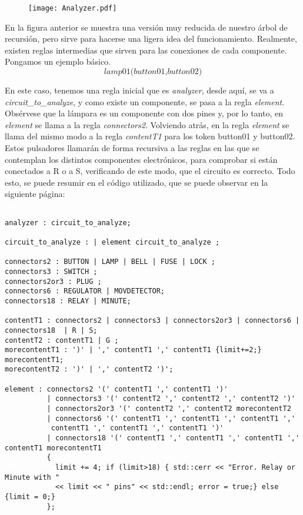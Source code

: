 \documentclass{article}
\begin{document}
\newpage


\begin{figure}[h!]
  \centering
  \texttt{[image: Analyzer.pdf]}
\end{figure}

En la figura anterior se muestra una versión muy reducida de nuestro árbol de recursión, pero sirve para hacerse una ligera idea del funcionamiento. Realmente, existen reglas intermedias que sirven para las conexiones de cada componente. Pongamos un ejemplo básico. $$\textit{lamp01(button01,button02)}$$

En este caso, tenemos una regla inicial que es \textit{analyzer}, desde aquí, se va a \textit{circuit\_to\_analyze}, y como existe un componente, se pasa a la regla \textit{element}. Obsérvese que la lámpara es un componente con dos pines y, por lo tanto, en \textit{element} se llama a la regla \textit{connectors2}. Volviendo atrás, en la regla \textit{element} se llama del mismo modo a la regla \textit{contentT1} para los token button01 y button02. Estos pulsadores llamarán de forma recursiva a las reglas en las que se contemplan los distintos componentes electrónicos, para comprobar si están conectados a R o a S, verificando de este modo, que el circuito es correcto. Todo esto, se puede resumir en el código utilizado, que se puede observar en la siguiente página:

\newpage

\begin{lstlisting}[basicstyle=\footnotesize]

analyzer : circuit_to_analyze;

circuit_to_analyze : | element circuit_to_analyze ;

connectors2 : BUTTON | LAMP | BELL | FUSE | LOCK ;
connectors3 : SWITCH ;
connectors2or3 : PLUG ;
connectors6 : REGULATOR | MOVDETECTOR;
connectors18 : RELAY | MINUTE;

contentT1 : connectors2 | connectors3 | connectors2or3 | connectors6 | connectors18  | R | S;
contentT2 : contentT1 | G ;
morecontentT1 : ')' | ',' contentT1 ',' contentT1 {limit+=2;} morecontentT1;
morecontentT2 : ')' | ',' contentT2 ')';

element : connectors2 '(' contentT1 ',' contentT1 ')'
          | connectors3 '(' contentT2 ',' contentT2 ',' contentT2 ')'
          | connectors2or3 '(' contentT2 ',' contentT2 morecontentT2
          | connectors6 '(' contentT1 ',' contentT1 ',' contentT1 ','
           contentT1 ',' contentT1 ',' contentT1 ')'
          | connectors18 '(' contentT1 ',' contentT1 ',' contentT1 ',' contentT1 morecontentT1
          {
            limit += 4; if (limit>18) { std::cerr << "Error. Relay or Minute with "
            << limit << " pins" << std::endl; error = true;} else {limit = 0;}
          };


\end{lstlisting}
\end{document}
